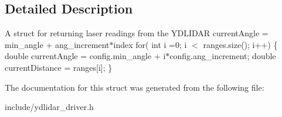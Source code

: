 \subsection{Detailed Description}
A struct for returning laser readings from the Y\+D\+L\+I\+D\+AR current\+Angle = min\+\_\+angle + ang\+\_\+increment$\ast$index for( int i =0; i $<$ ranges.\+size(); i++) \{ double current\+Angle = config.\+min\+\_\+angle + i$\ast$config.ang\+\_\+increment; double current\+Distance = ranges\mbox{[}i\mbox{]}; \} 

The documentation for this struct was generated from the following file\+:\begin{DoxyCompactItemize}
\item 
include/ydlidar\+\_\+driver.\+h\end{DoxyCompactItemize}
